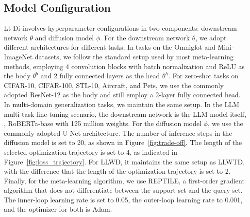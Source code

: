 \subsection{Model Configuration}
Lt-Di involves hyperparameter configurations in two components: downstream network $\theta$ and diffusion model $\phi$. For the downstream network $\theta$, we adopt different architectures for different tasks. In tasks on the Omniglot and Mini-ImageNet datasets, we follow the standard setup used by most meta-learning methods, employing 4 convolution blocks with batch normalization and ReLU as the body $\theta^b$ and 2 fully connected layers as the head $\theta^h$. For zero-shot tasks on CIFAR-10, CIFAR-100, STL-10, Aircraft, and Pets, we use the commonly adopted ResNet-12 as the body and still employ a 2-layer fully connected head. In multi-domain generalization tasks, we maintain the same setup. In the LLM multi-task fine-tuning scenario, the downstream network is the LLM model itself, \ie, RoBERTa-base with 125 million weights. For the diffusion model $\phi$, we use the commonly adopted U-Net architecture. The number of inference steps in the diffusion model is set to 20, as shown in Figure~\ref{fig:trade-off}. The length of the selected optimization trajectory is set to 4, as indicated in Figure~\ref{fig:loss_trajectory}. For LLWD, it maintains the same setup as LLWTD, with the difference that the length of the optimization trajectory is set to 2. Finally, for the meta-learning algorithm, we use REPTILE, a first-order gradient algorithm that does not differentiate between the support set and the query set. The inner-loop learning rate is set to 0.05, the outer-loop learning rate to 0.001, and the optimizer for both is Adam.

